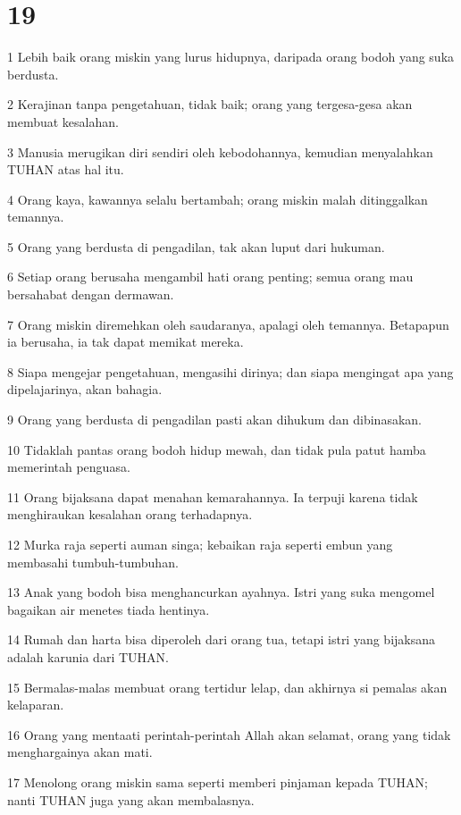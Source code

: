 \chapter{19}

\par 1 Lebih baik orang miskin yang lurus hidupnya, daripada orang bodoh yang suka berdusta.
\par 2 Kerajinan tanpa pengetahuan, tidak baik; orang yang tergesa-gesa akan membuat kesalahan.
\par 3 Manusia merugikan diri sendiri oleh kebodohannya, kemudian menyalahkan TUHAN atas hal itu.
\par 4 Orang kaya, kawannya selalu bertambah; orang miskin malah ditinggalkan temannya.
\par 5 Orang yang berdusta di pengadilan, tak akan luput dari hukuman.
\par 6 Setiap orang berusaha mengambil hati orang penting; semua orang mau bersahabat dengan dermawan.
\par 7 Orang miskin diremehkan oleh saudaranya, apalagi oleh temannya. Betapapun ia berusaha, ia tak dapat memikat mereka.
\par 8 Siapa mengejar pengetahuan, mengasihi dirinya; dan siapa mengingat apa yang dipelajarinya, akan bahagia.
\par 9 Orang yang berdusta di pengadilan pasti akan dihukum dan dibinasakan.
\par 10 Tidaklah pantas orang bodoh hidup mewah, dan tidak pula patut hamba memerintah penguasa.
\par 11 Orang bijaksana dapat menahan kemarahannya. Ia terpuji karena tidak menghiraukan kesalahan orang terhadapnya.
\par 12 Murka raja seperti auman singa; kebaikan raja seperti embun yang membasahi tumbuh-tumbuhan.
\par 13 Anak yang bodoh bisa menghancurkan ayahnya. Istri yang suka mengomel bagaikan air menetes tiada hentinya.
\par 14 Rumah dan harta bisa diperoleh dari orang tua, tetapi istri yang bijaksana adalah karunia dari TUHAN.
\par 15 Bermalas-malas membuat orang tertidur lelap, dan akhirnya si pemalas akan kelaparan.
\par 16 Orang yang mentaati perintah-perintah Allah akan selamat, orang yang tidak menghargainya akan mati.
\par 17 Menolong orang miskin sama seperti memberi pinjaman kepada TUHAN; nanti TUHAN juga yang akan membalasnya.
